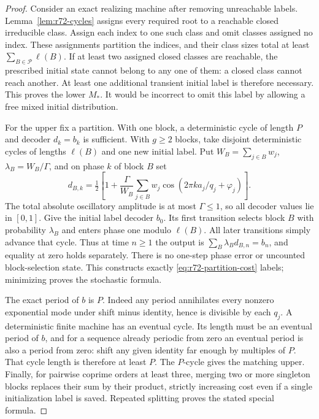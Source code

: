 \begin{proof}
Consider an exact realizing machine after removing unreachable labels. Lemma~\ref{lem:r72-cycles} assigns every required root to a reachable closed irreducible class. Assign each index to one such class and omit classes assigned no index. These assignments partition the indices, and their class sizes total at least $\sum_{B\in\mathcal P}\ell(B)$. If at least two assigned closed classes are reachable, the prescribed initial state cannot belong to any one of them: a closed class cannot reach another. At least one additional transient initial label is therefore necessary. This proves the lower $M_*$. It would be incorrect to omit this label by allowing a free mixed initial distribution.

For the upper fix a partition. With one block, a deterministic cycle of length $P$ and decoder $d_k=b_k$ is sufficient. With $g\ge2$ blocks, take disjoint deterministic cycles of lengths $\ell(B)$ and one new initial label. Put $W_B=\sum_{j\in B}w_j$, $\lambda_B=W_B/\Gamma$, and on phase $k$ of block $B$ set
\[
 d_{B,k}=\tfrac12\left[1+\frac{\Gamma}{W_B}
        \sum_{j\in B}w_j\cos(2\pi k a_j/q_j+\varphi_j)\right].
\]
The total absolute oscillatory amplitude is at most $\Gamma\le1$, so all decoder values lie in $[0,1]$. Give the initial label decoder $b_0$. Its first transition selects block $B$ with probability $\lambda_B$ and enters phase one modulo $\ell(B)$. All later transitions simply advance that cycle. Thus at time $n\ge1$ the output is $\sum_B\lambda_B d_{B,n}=b_n$, and equality at zero holds separately. There is no one-step phase error or uncounted block-selection state. This constructs exactly \eqref{eq:r72-partition-cost} labels; minimizing proves the stochastic formula.

The exact period of $b$ is $P$. Indeed any period annihilates every nonzero exponential mode under shift minus identity, hence is divisible by each $q_j$. A deterministic finite machine has an eventual cycle. Its length must be an eventual period of $b$, and for a sequence already periodic from zero an eventual period is also a period from zero: shift any given identity far enough by multiples of $P$. That cycle length is therefore at least $P$. The $P$-cycle gives the matching upper. Finally, for pairwise coprime orders at least three, merging two or more singleton blocks replaces their sum by their product, strictly increasing cost even if a single initialization label is saved. Repeated splitting proves the stated special formula.
\end{proof}


